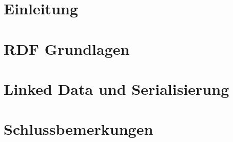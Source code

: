 \documentclass[12pt,
               a4paper,
               twoside=false,
               titlepage=true,
               bibliography=totoc, %
               listof=totoc, %
               numbers=noenddot]{scrartcl}
\begin{document}


\setcounter{page}{2}
\newpage

\tableofcontents %
\newpage
\listoffigures %
\newpage
\listoftables %
\newpage
\lstlistoflistings
\newpage
\listofformels %
\newpage

\newpage

\setcounter{page}{3}
\section{Einleitung}
\label{sec:einleitung}


\section{RDF Grundlagen}
\label{sec:rdf-grundlagen}
 

\section{Linked Data und Serialisierung}
\label{sec:linked-data-serialisierung}


\section{Schlussbemerkungen}
\label{sec:schlussbemerkungen}


\printbibliography[heading=bibintoc, title={Literaturverzeichnis}]	
\newpage
\end{document}
